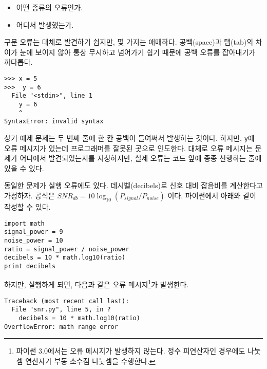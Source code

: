 \begin{itemize}

\item 어떤 종류의 오류인가.

\item 어디서 발생했는가.

\end{itemize}

구문 오류는 대체로 발견하기 쉽지만, 몇 가지는 애매하다. 공백(space)과 탭(tab)의 차이가 눈에 보이지 않아 
통상 무시하고 넘어가기 쉽기 때문에 공백 오류를 잡아내기가 까다롭다.


\beforeverb
\begin{verbatim}
>>> x = 5
>>>  y = 6
  File "<stdin>", line 1
    y = 6
    ^
SyntaxError: invalid syntax
\end{verbatim}
\afterverb
%
상기 예제 문제는 두 번째 줄에 한 칸 공백이 들여써서 발생하는 것이다. 
하지만, {\tt y}에 오류 메시지가 있는데 프로그래머를 잘못된 곳으로 인도한다. 
대체로 오류 메시지는 문제가 어디에서 발견되었는지를 지칭하지만, 실제 오류는 코드 앞에 종종 선행하는 줄에 있을 수 있다.


동일한 문제가 실행 오류에도 있다. 
데시벨(decibels)로 신호 대비 잡음비를 계산한다고 가정하자. 
공식은 $SNR_{db} = 10 \log_{10} (P_{signal} / P_{noise})$ 이다. 
파이썬에서 아래와 같이 작성할 수 있다.

\beforeverb
\begin{verbatim}
import math
signal_power = 9
noise_power = 10
ratio = signal_power / noise_power
decibels = 10 * math.log10(ratio)
print decibels
\end{verbatim}
\afterverb
%

하지만, 실행하게 되면, 다음과 같은 오류 메시지\footnote{파이썬 3.0에서는 오류 메시지가 발생하지 않는다.
 정수 피연산자인 경우에도 나눗셈 연산자가 부동 소수점 나눗셈을 수행한다.}가 발생한다. 


\beforeverb
\begin{verbatim}
Traceback (most recent call last):
  File "snr.py", line 5, in ?
    decibels = 10 * math.log10(ratio)
OverflowError: math range error
\end{verbatim}
\afterverb
%

